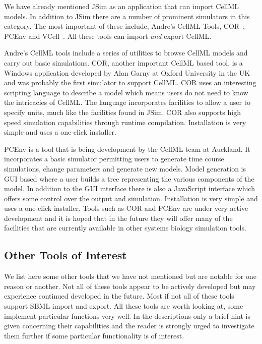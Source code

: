 \documentclass[12pt]{article}
\begin{document}
We have already mentioned JSim as an application that can import
CellML models. In addition to JSim there are a number of prominent
simulators in this category. The most important of these include,
Andre's CellML Tools, COR~\citep{Garny:2003}, PCEnv and
VCell~\citep{VCell2003}. All these tools can import {\em and} export
CellML.

Andre's CellML tools include a series of utilities to browse CellML
models and carry out basic simulations. COR, another important
CellML based tool, is a Windows application developed by Alan Garny
at Oxford University in the UK and was probably the first simulator
to support CellML. COR uses an interesting scripting language to
describe a model which means users do not need to know the
intricacies of CellML. The language incorporates facilities to allow
a user to specify units, much like the facilities found in JSim. COR
also supports high speed simulation capabilities through runtime
compilation. Installation is very simple and uses a one-click
installer.

PCEnv is a tool that is being development by the CellML team at
Auckland. It incorporates a basic simulator permitting users to
generate time course simulations, change parameters and generate new
models. Model generation is GUI based where a user builds a tree
representing the various components of the model. In addition to the
GUI interface there is also a JavaScript interface which offers some
control over the output and simulation. Installation is very simple
and uses a one-click installer. Tools such as COR and PCEnv are
under very active development and it is hoped that in the future
they will offer many of the facilities that are currently available
in other systems biology simulation tools.

\subsection{Other Tools of Interest}

We list here some other tools that we have not mentioned but are
notable for one reason or another. Not all of these tools appear to
be actively developed but may experience continued developed in the
future. Most if not all of these tools support SBML import and
export. All these tools are worth looking at, some implement
particular functions very well. In the descriptions only a brief
hint is given concerning their capabilities and the reader is
strongly urged to investigate them further if some particular
functionality is of interest.
\end{document}
